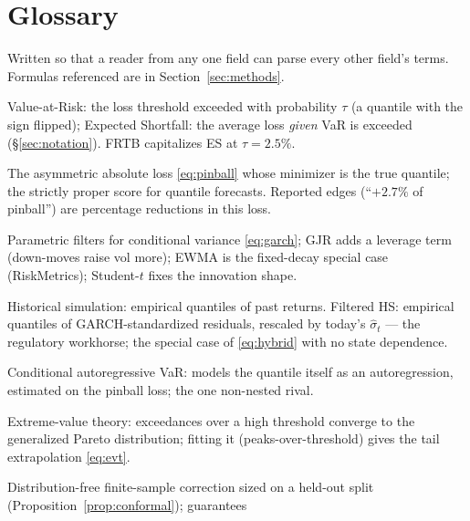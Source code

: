 \section{Glossary}\label{app:glossary}

Written so that a reader from any one field can parse every other
field's terms. Formulas referenced are in Section~\ref{sec:methods}.

\begin{description}[leftmargin=1.6em,itemsep=1pt,font=\normalfont\bfseries]
\item[VaR / ES] Value-at-Risk: the loss threshold exceeded with
probability $\tau$ (a quantile with the sign flipped); Expected
Shortfall: the average loss \emph{given} VaR is exceeded
(\S\ref{sec:notation}). FRTB capitalizes ES at $\tau=2.5\%$.
\item[Pinball (check) loss] The asymmetric absolute loss
\eqref{eq:pinball} whose minimizer is the true quantile; the strictly
proper score for quantile forecasts. Reported edges (``$+2.7\%$ of
pinball'') are percentage reductions in this loss.
\item[GARCH-$t$ / GJR / EWMA] Parametric filters for conditional
variance \eqref{eq:garch}; GJR adds a leverage term (down-moves raise
vol more); EWMA is the fixed-decay special case (RiskMetrics);
Student-$t$ fixes the innovation shape.
\item[HS / FHS] Historical simulation: empirical quantiles of past
returns. Filtered HS: empirical quantiles of GARCH-standardized
residuals, rescaled by today's $\widehat\sigma_t$ --- the regulatory
workhorse; the special case of \eqref{eq:hybrid} with no state
dependence.
\item[CAViaR] Conditional autoregressive VaR: models the quantile
itself as an autoregression, estimated on the pinball loss; the one
non-nested rival.
\item[EVT / GPD / POT] Extreme-value theory: exceedances over a high
threshold converge to the generalized Pareto distribution; fitting it
(peaks-over-threshold) gives the tail extrapolation \eqref{eq:evt}.
\item[Conformal prediction] Distribution-free finite-sample correction
sized on a held-out split (Proposition~\ref{prop:conformal}); guarantees

\end{description}
